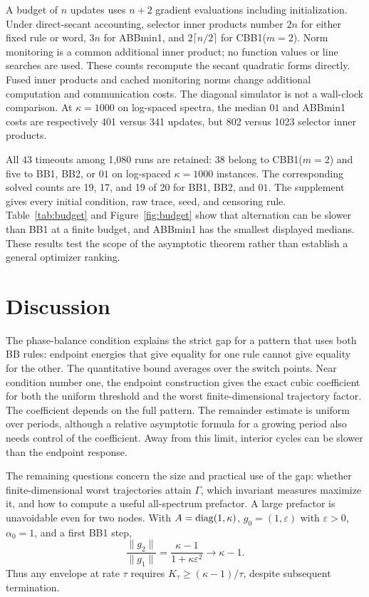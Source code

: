 \documentclass[letterpaper,twoside]{article}
\begin{document}
A budget of $n$ updates uses $n+2$ gradient evaluations including initialization. Under direct-secant accounting, selector inner products number $2n$ for either fixed rule or word, $3n$ for ABBmin1, and $2\lceil n/2\rceil$ for CBB1($m=2$). Norm monitoring is a common additional inner product; no function values or line searches are used. These counts recompute the secant quadratic forms directly. Fused inner products and cached monitoring norms change additional computation and communication costs. The diagonal simulator is not a wall-clock comparison. At $\kappa=1000$ on log-spaced spectra, the median $01$ and ABBmin1 costs are respectively 401 versus 341 updates, but 802 versus 1023 selector inner products.

All 43 timeouts among 1,080 runs are retained: 38 belong to CBB1($m=2$) and five to BB1, BB2, or $01$ on log-spaced $\kappa=1000$ instances. The corresponding solved counts are 19, 17, and 19 of 20 for BB1, BB2, and $01$. The supplement gives every initial condition, raw trace, seed, and censoring rule. Table~\ref{tab:budget} and Figure~\ref{fig:budget} show that alternation can be slower than BB1 at a finite budget, and ABBmin1 has the smallest displayed medians. These results test the scope of the asymptotic theorem rather than establish a general optimizer ranking.

\newpage
\section{Discussion}\label{sec:discussion}
The phase-balance condition explains the strict gap for a pattern that uses both BB rules: endpoint energies that give equality for one rule cannot give equality for the other. The quantitative bound averages over the switch points. Near condition number one, the endpoint construction gives the exact cubic coefficient for both the uniform threshold and the worst finite-dimensional trajectory factor. The coefficient depends on the full pattern. The remainder estimate is uniform over periods, although a relative asymptotic formula for a growing period also needs control of the coefficient. Away from this limit, interior cycles can be slower than the endpoint response.

The remaining questions concern the size and practical use of the gap: whether finite-dimensional worst trajectories attain $\Gamma$, which invariant measures maximize it, and how to compute a useful all-spectrum prefactor. A large prefactor is unavoidable even for two nodes. With $A=\operatorname{diag}(1,\kappa)$, $g_0=(1,\varepsilon)$ with $\varepsilon>0$, $\alpha_0=1$, and a first BB1 step,
\[
 \frac{\|g_2\|}{\|g_1\|}
 =\frac{\kappa-1}{1+\kappa\varepsilon^2}\longrightarrow\kappa-1.
\]
Thus any envelope at rate $\tau$ requires $K_\tau\ge(\kappa-1)/\tau$, despite subsequent termination.
\end{document}

